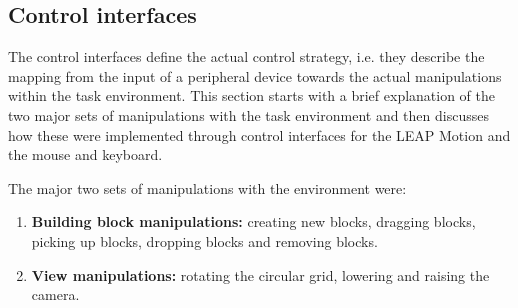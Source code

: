 \subsection{Control interfaces}\label{sec:interface}

The control interfaces define the actual control strategy, i.e. they describe the mapping from the input of a peripheral device towards the actual manipulations within the task environment. This section starts with a brief explanation of the two major sets of manipulations with the task environment and then discusses how these were implemented through control interfaces for the LEAP Motion and the mouse and keyboard. 

The major two sets of manipulations with the environment were:
\begin{enumerate}
	\item{\textbf{Building block manipulations:}} creating new blocks, dragging blocks, picking up blocks, dropping blocks and removing blocks.
	\item{\textbf{View manipulations:}} rotating the circular grid, lowering and raising the camera.
\end{enumerate}


